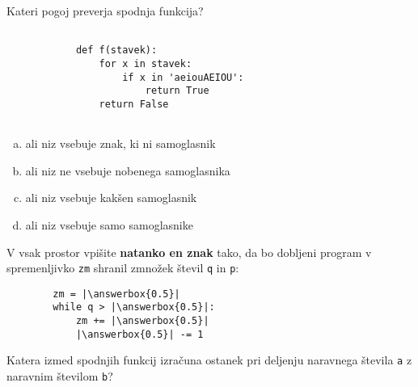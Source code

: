 \documentclass[arhiv, 10pt]{../izpit}
\newcommand{\inlinepy}[1]{\texttt{#1}}
\newcommand{\answerbox}[1]{\framebox{\vphantom{\large M}\hspace{#1cm}}}
\begin{document}
        \naloga*

        \begin{multicols}{2}
        \noindent
        Kateri pogoj preverja spodnja funkcija?
        \begin{verbatim}
        
            def f(stavek):
                for x in stavek:
                    if x in 'aeiouAEIOU':
                        return True
                return False
            
        \end{verbatim}

        \begin{enumerate}[(a)]
\item ali niz vsebuje znak, ki ni samoglasnik
\item ali niz ne vsebuje nobenega samoglasnika
\item ali niz vsebuje kakšen samoglasnik
\item ali niz vsebuje samo samoglasnike
\end{enumerate}

        \end{multicols}
    
        \naloga*
        \begin{multicols}{2}
        \noindent
        V vsak prostor vpišite \textbf{natanko en znak} tako, da bo dobljeni program v spremenljivko \inlinepy{zm} shranil zmnožek števil \inlinepy{q} in \inlinepy{p}:
        
        \columnbreak
        \begin{verbatim}
        zm = |\answerbox{0.5}|
        while q > |\answerbox{0.5}|:
            zm += |\answerbox{0.5}|
            |\answerbox{0.5}| -= 1
        \end{verbatim}
        \end{multicols}
    
        \clearpage
        \naloga
        
        Katera izmed spodnjih funkcij izračuna ostanek pri deljenju naravnega števila \inlinepy{a} z naravnim številom \inlinepy{b}?
    
\end{document}
